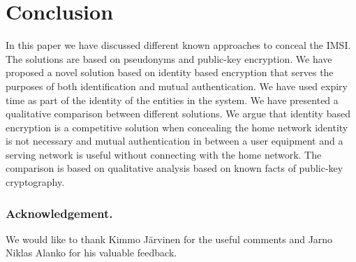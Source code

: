 \documentclass{llncs} %
\begin{document}
\section{Conclusion}
\label{sec:conclusion}In this paper we have discussed different known approaches to conceal the IMSI. The solutions  are based on pseudonyms and public-key encryption. We have proposed a novel solution based on identity based encryption that serves the purposes of both identification and mutual authentication. We have used expiry time as part of the identity of the entities in the system. We have presented a qualitative comparison between different  solutions. We argue that identity based encryption is a competitive solution when concealing the home network identity is not necessary and mutual authentication in between a user equipment and a serving network is useful without connecting with the home network. The comparison is based on qualitative analysis based on known facts of public-key cryptography.



\subsubsection{Acknowledgement.}
\label{sec:acknowledgement}
We would like to thank Kimmo J\"arvinen for the useful comments and Jarno Niklas Alanko for his valuable feedback.

%
\end{document}
